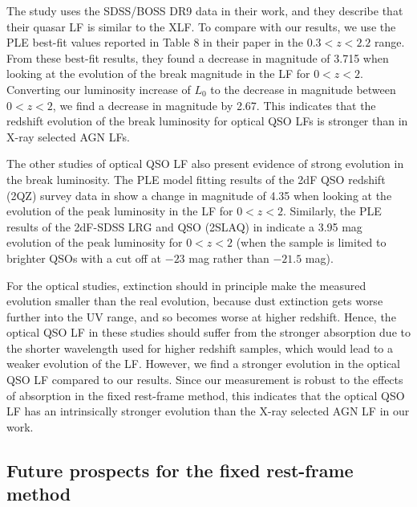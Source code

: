 \documentclass[fleqn,usenatbib]{mnras}
\begin{document}
    The \cite{ross2013quasarlf} study uses the SDSS/BOSS DR9 data in their work, and they describe that their quasar LF is similar to the XLF.
    To compare with our results, we use the PLE best-fit values reported in Table 8 in their paper in the $0.3 < z < 2.2$ range. 
    From these best-fit results, they found a decrease in magnitude of 3.715 when looking at the evolution of the break magnitude in the LF for $0 < z < 2$.
    Converting our luminosity increase of $L_0$ to the decrease in magnitude between $0 < z < 2$, we find a decrease in magnitude by 2.67. 
    This indicates that the redshift evolution of the break luminosity for optical QSO LFs is stronger than in X-ray selected AGN LFs.
    
    The other studies of optical QSO LF also present evidence of strong evolution in the break luminosity. 
    The PLE model fitting results of the 2dF QSO redshift (2QZ) survey data in \cite{croom2004qso} show a change in magnitude of 4.35 when looking at the evolution of the peak luminosity in the LF for $0 < z < 2$.
    Similarly, the PLE results of the 2dF-SDSS LRG and QSO (2SLAQ) in \cite{croom2009sdss} indicate a 3.95 mag evolution of the peak luminosity for $0 < z < 2$ (when the sample is limited to brighter QSOs with a cut off at $-23$ mag rather than $-21.5$ mag).
    
    For the optical studies, extinction should in principle make the measured evolution smaller than the real evolution, because dust extinction gets worse further into the UV range, and so becomes worse at higher redshift.
    Hence, the optical QSO LF in these studies should suffer from the stronger absorption due to the shorter wavelength used for higher redshift samples, which would lead to a weaker evolution of the LF.
    However, we find a stronger evolution in the optical QSO LF compared to our results.
    Since our measurement is robust to the effects of absorption in the fixed rest-frame method, this indicates that the optical QSO LF has an intrinsically stronger evolution than the X-ray selected AGN LF in our work. 

    
	\subsection{Future prospects for the fixed rest-frame method}\label{subsec:futureprospects}  
\end{document}
